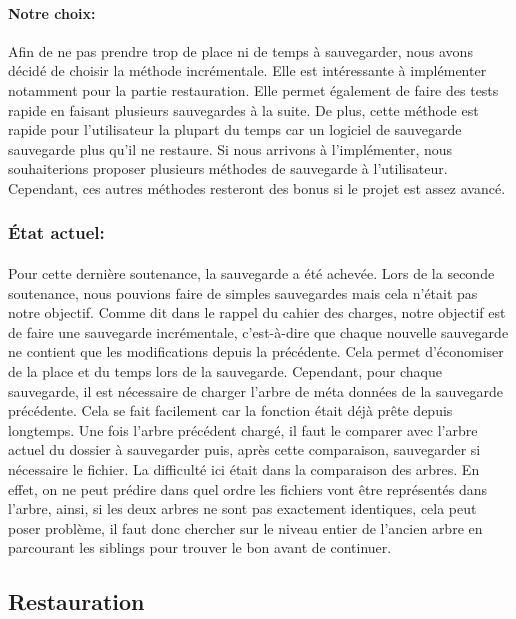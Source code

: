             \paragraph*{Notre choix:\\}
            Afin de ne pas prendre trop de place ni de temps à sauvegarder, nous avons décidé de choisir la méthode incrémentale. Elle est intéressante à implémenter notamment pour la partie restauration. Elle permet également de faire des tests rapide en faisant plusieurs sauvegardes à la suite. De plus, cette méthode est rapide pour l'utilisateur la plupart du temps car un logiciel de sauvegarde sauvegarde plus qu'il ne restaure. Si nous arrivons à l'implémenter, nous souhaiterions proposer plusieurs méthodes de sauvegarde à l'utilisateur. Cependant, ces autres méthodes resteront des bonus si le projet est assez avancé.
        \subsubsection{État actuel:}
            \paragraph*{}
            Pour cette dernière soutenance, la sauvegarde a été achevée. Lors de la seconde soutenance, nous pouvions faire de simples sauvegardes mais cela n'était pas notre objectif. Comme dit dans le rappel du cahier des charges, notre objectif est de faire une sauvegarde incrémentale, c'est-à-dire que chaque nouvelle sauvegarde ne contient que les modifications depuis la précédente. Cela permet d'économiser de la place et du temps lors de la sauvegarde. Cependant, pour chaque sauvegarde, il est nécessaire de charger l'arbre de méta données de la sauvegarde précédente. Cela se fait facilement car la fonction était déjà prête depuis longtemps. Une fois l'arbre précédent chargé, il faut le comparer avec l'arbre actuel du dossier à sauvegarder puis, après cette comparaison, sauvegarder si nécessaire le fichier. La difficulté ici était dans la comparaison des arbres. En effet, on ne peut prédire dans quel ordre les fichiers vont être représentés dans l'arbre, ainsi, si les deux arbres ne sont pas exactement identiques, cela peut poser problème, il faut donc chercher sur le niveau entier de l'ancien arbre en parcourant les siblings pour trouver le bon avant de continuer.
            \newpage
    \subsection{Restauration}
